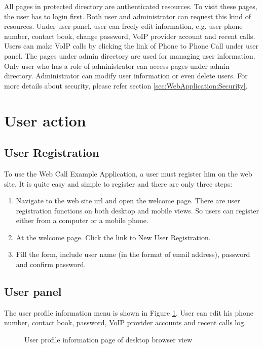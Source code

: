 All pages in protected directory are authenticated resources. To visit these pages, the user has to login first. Both user and administrator can request this kind of resources. Under user panel, user can freely edit information, e.g. user phone number, contact book, change password, VoIP provider account and recent calls. Users can make VoIP calls by clicking the link of Phone to Phone Call under user panel. 
The pages under admin directory are used for managing user information. Only user who has a role of administrator can access pages under admin directory. Administrator can modify user information or even delete users. 
For more details about security, please refer section \ref{sec:WebApplication:Security}.

\section{User action}
\label{sec:WebApplication:UserAction}

\subsection{User Registration}

To use the Web Call Example Application, a user must register him on the web site. It is quite easy and simple to register and there are only three steps: 
\begin{enumerate}
\item Navigate to the web site url and open the welcome page. There are user registration functions on both desktop and mobile views. So users can register either from a computer or a mobile phone.
\item At the welcome page. Click the link to New User Registration.
\item Fill the form, include user name (in the format of email address), password and confirm password.
\end{enumerate}

\subsection{User panel}
\label{sec:WebApplication:UserAction:UserPanel}

The user profile information menu is shown in Figure \ref{fig:UserProfileInformationDesktopView}. User can edit his phone number, contact book, password, VoIP provider accounts and recent calls log.

\begin{figure}[!hbtp]
\centering
{}
\caption{User profile information page of desktop browser view}
\label{fig:UserProfileInformationDesktopView}
\end{figure} 

